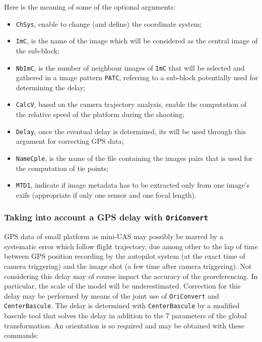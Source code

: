 Here is the meaning of some of the optional arguments:

\begin{itemize}
    \item {\tt ChSys}, enable to change (and define) the coordinate system;
    \item {\tt ImC}, is the name of the image which will be considered as the central image of the sub-block;
    \item {\tt NbImC}, is the number of neighbour images of {\tt ImC} that will be selected and gathered in a image pattern {\tt PATC}, referring to a sub-block potentially used for determining the delay;
		\item {\tt CalcV}, based on the camera trajectory analysis, enable the computation of the relative speed of the platform during the shooting;
		\item {\tt Delay}, once the eventual delay is determined, its will be used through this argument for correcting GPS data;
		\item {\tt NameCple}, is the name of the file containing the images pairs that is used for the computation of tie points;
		\item {\tt MTD1}, indicate if image metadata has to be extracted only from one image's exifs (appropriate if only one sensor and one focal length).
\end{itemize}
\vspace{\baselineskip}

\subsubsection{Taking into account a GPS delay with {\tt OriConvert}}\label{OriConvert:GPSdelay}

GPS data of small platform as mini-UAS may possibly be marred by a systematic error which follow flight trajectory, due among other to the lap of time between GPS position recording by the autopilot system (at the exact time of camera triggering) and the image shot (a few time after camera triggering). Not considering this delay may of course impact the accuracy of the georeferencing. In particular, the scale of the model will be underestimated. Correction for this delay may be performed by means of the joint use of {\tt OriConvert} and {\tt CenterBascule}. The delay is determined with {\tt CenterBascule} by a modified bascule tool that solves the delay in addition to the 7 parameters of the global transformation. An orientation is so required and may be obtained with these commands:

